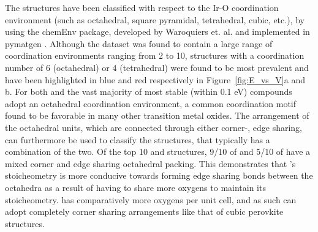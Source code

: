%
The structures have been classified with respect to the Ir-O coordination environment (such as octahedral, square pyramidal, tetrahedral, cubic, etc.),
by using the chemEnv package, developed by Waroquiers et. al. \cite{Waroquiers2017} and implemented in pymatgen \cite{Ong2013}.
%
Although the dataset was found to contain a large range of coordination environments ranging from 2 to 10,
structures with a coordination number of 6 (octahedral) or 4 (tetrahedral) were found to be most prevalent
and have been highlighted in blue and red respectively in Figure~\ref{fig:E_vs_V}a and b.
%
For both \IrOtwo and \IrOthree the vast majority of most stable (within 0.1 eV) compounds adopt an octahedral coordination environment, a common coordination motif found to be favorable in many other transition metal oxides.\cite{Waroquiers2017}
%
The arrangement of the octahedral units, which are connected through either corner-, edge sharing,
can furthermore be used to classify the structures, that typically has a combination of the two.
%
Of the top 10 \IrOtwo and \IrOthree structures, 9/10 of \IrOtwo and 5/10 of \IrOthree have a mixed corner and edge sharing octahedral packing.
%
This demonstrates that \IrOtwo's stoicheometry is more conducive towards forming edge sharing bonds between the octahedra as a result of having to share more oxygens to maintain its stoicheometry.
%
\IrOthree has comparatively more oxygens per unit cell, and as such can adopt completely corner sharing arrangements like that of cubic perovkite structures.


